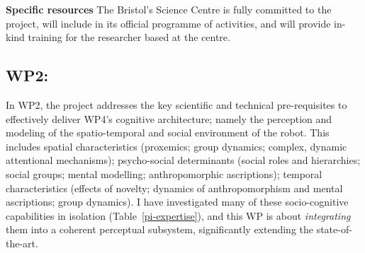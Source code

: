 \textbf{Specific resources} The Bristol's Science Centre is fully committed to the
project, will include \project in its official programme of activities, and will
provide in-kind training for the \project researcher based at the centre.

% 
% 
% 
% 
% 
% 
% 
% 
% 



\subsection{WP2: \textbf{\wpTwo}}


In WP2, the project addresses the key scientific and technical pre-requisites to
effectively deliver WP4's cognitive architecture; namely the perception and modeling of
the spatio-temporal and social environment of the robot. This includes spatial
characteristics (proxemics; group dynamics; complex, dynamic attentional
mechanisms); psycho-social determinants (social roles and hierarchies; social
groups; mental modelling; anthropomorphic ascriptions); temporal characteristics
(effects of novelty; dynamics of anthropomorphism and mental ascriptions; group
dynamics). I have investigated many of these socio-cognitive capabilities in
isolation (Table~\ref{pi-expertise}), and this WP is about
\emph{integrating} them into a coherent perceptual subsystem, significantly
extending the state-of-the-art.

